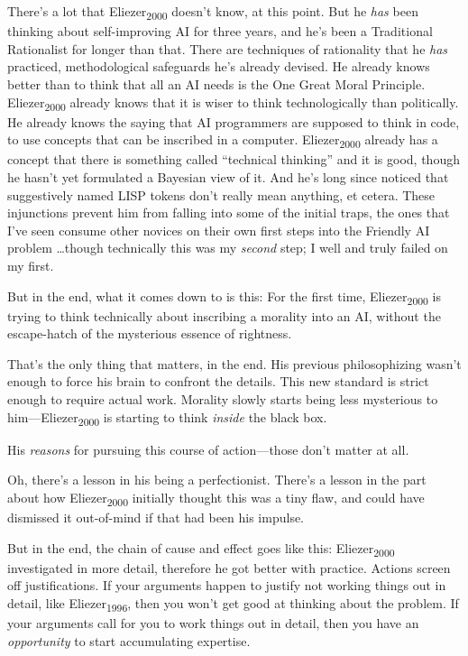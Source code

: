 {
 There's a lot that Eliezer\textsubscript{2000}
doesn't know, at this point. But he \textit{has} been
thinking about self-improving AI for three years, and
he's been a Traditional Rationalist for longer than
that. There are techniques of rationality that he \textit{has}
practiced, methodological safeguards he's already
devised. He already knows better than to think that all an AI needs is
the One Great Moral Principle. Eliezer\textsubscript{2000} already
knows that it is wiser to think technologically than politically. He
already knows the saying that AI programmers are supposed to think in
code, to use concepts that can be inscribed in a computer.
Eliezer\textsubscript{2000} already has a concept that there is
something called ``technical
thinking'' and it is good, though he
hasn't yet formulated a Bayesian view of it. And
he's long since noticed that suggestively named LISP
tokens don't really mean anything, et cetera. These
injunctions prevent him from falling into some of the initial traps,
the ones that I've seen consume other novices on their
own first steps into the Friendly AI problem \ldots though technically
this was my \textit{second} step; I well and truly failed on my first.}

{
 But in the end, what it comes down to is this: For the first time,
Eliezer\textsubscript{2000} is trying to think technically about
inscribing a morality into an AI, without the escape-hatch of the
mysterious essence of rightness.}

{
 That's the only thing that matters, in the end.
His previous philosophizing wasn't enough to force his
brain to confront the details. This new standard is strict enough to
require actual work. Morality slowly starts being less mysterious to
him---Eliezer\textsubscript{2000} is starting to think \textit{inside}
the black box.}

{
 His \textit{reasons} for pursuing this course of action---those
don't matter at all.}

{
 Oh, there's a lesson in his being a perfectionist.
There's a lesson in the part about how
Eliezer\textsubscript{2000} initially thought this was a tiny flaw, and
could have dismissed it out-of-mind if that had been his impulse.}

{
 But in the end, the chain of cause and effect goes like this:
Eliezer\textsubscript{2000} investigated in more detail, therefore he
got better with practice. Actions screen off justifications. If your
arguments happen to justify not working things out in detail, like
Eliezer\textsubscript{1996}, then you won't get good at
thinking about the problem. If your arguments call for you to work
things out in detail, then you have an \textit{opportunity} to start
accumulating expertise.}

